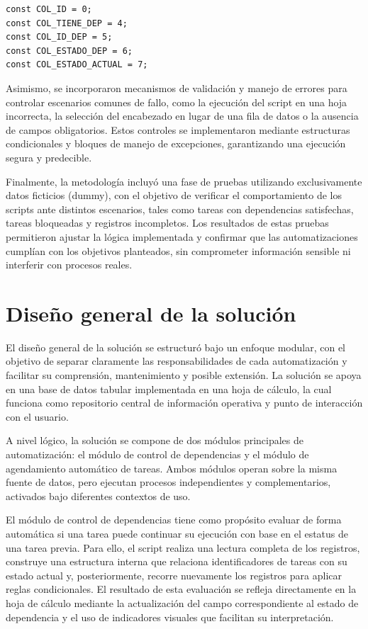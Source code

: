 \documentclass[12pt]{article}
\begin{document}
\begin{verbatim}
const COL_ID = 0;
const COL_TIENE_DEP = 4;
const COL_ID_DEP = 5;
const COL_ESTADO_DEP = 6;
const COL_ESTADO_ACTUAL = 7;
\end{verbatim}

Asimismo, se incorporaron mecanismos de validación y manejo de errores para controlar escenarios comunes de fallo, como la ejecución del script en una hoja incorrecta, la selección del encabezado en lugar de una fila de datos o la ausencia de campos obligatorios. Estos controles se implementaron mediante estructuras condicionales y bloques de manejo de excepciones, garantizando una ejecución segura y predecible.

Finalmente, la metodología incluyó una fase de pruebas utilizando exclusivamente datos ficticios (dummy), con el objetivo de verificar el comportamiento de los scripts ante distintos escenarios, tales como tareas con dependencias satisfechas, tareas bloqueadas y registros incompletos. Los resultados de estas pruebas permitieron ajustar la lógica implementada y confirmar que las automatizaciones cumplían con los objetivos planteados, sin comprometer información sensible ni interferir con procesos reales.


\section*{Diseño general de la solución}

El diseño general de la solución se estructuró bajo un enfoque modular, con el objetivo de separar claramente las responsabilidades de cada automatización y facilitar su comprensión, mantenimiento y posible extensión. La solución se apoya en una base de datos tabular implementada en una hoja de cálculo, la cual funciona como repositorio central de información operativa y punto de interacción con el usuario.

A nivel lógico, la solución se compone de dos módulos principales de automatización: el módulo de control de dependencias y el módulo de agendamiento automático de tareas. Ambos módulos operan sobre la misma fuente de datos, pero ejecutan procesos independientes y complementarios, activados bajo diferentes contextos de uso.

El módulo de control de dependencias tiene como propósito evaluar de forma automática si una tarea puede continuar su ejecución con base en el estatus de una tarea previa. Para ello, el script realiza una lectura completa de los registros, construye una estructura interna que relaciona identificadores de tareas con su estado actual y, posteriormente, recorre nuevamente los registros para aplicar reglas condicionales. El resultado de esta evaluación se refleja directamente en la hoja de cálculo mediante la actualización del campo correspondiente al estado de dependencia y el uso de indicadores visuales que facilitan su interpretación.
\end{document}
